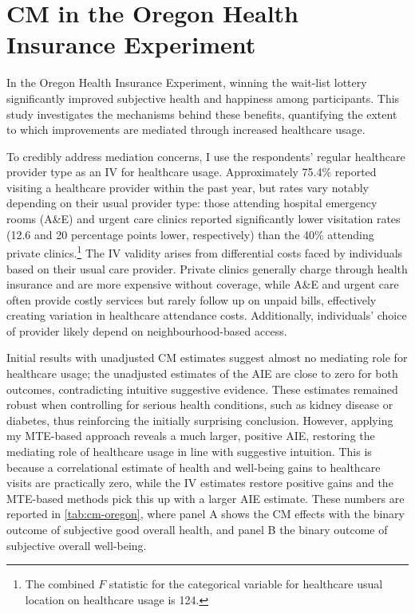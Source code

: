\section{CM in the Oregon Health Insurance Experiment}
\label{sec:oregon}
In the Oregon Health Insurance Experiment, winning the wait-list lottery significantly improved subjective health and happiness among participants. 
This study investigates the mechanisms behind these benefits, quantifying the extent to which improvements are mediated through increased healthcare usage.

To credibly address mediation concerns, I use the respondents' regular healthcare provider type as an IV for healthcare usage.
Approximately 75.4\% reported visiting a healthcare provider within the past year, but rates vary notably depending on their usual provider type: those attending hospital emergency rooms (A\&E) and urgent care clinics reported significantly lower visitation rates (12.6 and 20 percentage points lower, respectively) than the 40\% attending private clinics.\footnote{
    The combined $F$ statistic for the categorical variable for healthcare usual location on healthcare usage is 124.
}
The IV validity arises from differential costs faced by individuals based on their usual care provider.
Private clinics generally charge through health insurance and are more expensive without coverage, while A\&E and urgent care often provide costly services but rarely follow up on unpaid bills, effectively creating variation in healthcare attendance costs.
Additionally, individuals' choice of provider likely depend on neighbourhood-based access.

Initial results with unadjusted CM estimates suggest almost no mediating role for healthcare usage; the unadjusted estimates of the AIE are close to zero for both outcomes, contradicting intuitive suggestive evidence.
These estimates remained robust when controlling for serious health conditions, such as kidney disease or diabetes, thus reinforcing the initially surprising conclusion.
However, applying my MTE-based approach reveals a much larger, positive AIE, restoring the mediating role of healthcare usage in line with suggestive intuition.
This is because a correlational estimate of health and well-being gains to healthcare visits are practically zero, while the IV estimates restore positive gains and the MTE-based methods pick this up with a larger AIE estimate.
These numbers are reported in \autoref{tab:cm-oregon}, where panel A shows the CM effects with the binary outcome of subjective good overall health, and panel B the binary outcome of subjective overall well-being.

